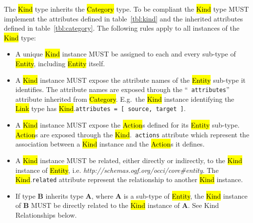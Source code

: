 \documentclass[10pt,a4paper]{article}
\begin{document}
The \hl{Kind} type inherits the \hl{Category} type. To be compliant the \hl{Kind}
type MUST implement the attributes defined in table~\ref{tbl:kind} and the inherited
attributes defined in table~\ref{tbl:category}. The following rules apply to all
instances of the \hl{Kind} type:
\begin{itemize}
\item A unique \hl{Kind} instance MUST be assigned to each and every sub-type
 of \hl{Entity}, including \hl{Entity} itself.
\item A \hl{Kind} instance MUST expose the attribute names of the \hl{Entity}
 sub-type it identifies. The attribute names are exposed through the ``{\tt
 attributes}'' attribute inherited from \hl{Category}. E.g.~the \hl{Kind}
 instance identifying the \hl{Link} type has \hl{Kind}.{\tt attributes =
 [ source, target ]}.
\item A \hl{Kind} instance MUST expose the \hl{Action}s defined for its
 \hl{Entity} sub-type. \hl{Action}s are exposed through the \hl{Kind}.{\tt
 actions} attribute which represent the association between a \hl{Kind}
 instance and the \hl{Action}s it defines.
\item A \hl{Kind} instance MUST be related, either directly or indirectly, to
 the \hl{Kind} instance of \hl{Entity},
 i.e. \textit{http://schemas.ogf.org/occi/core\#entity}.
 The \hl{Kind}.{\tt related} attribute represent the relationship to another
 \hl{Kind} instance.
\item If type {\bf B} inherits type {\bf A}, where {\bf A} is a sub-type of
 \hl{Entity}, the \hl{Kind} instance of {\bf B} MUST be directly related to the
 \hl{Kind} instance of {\bf A}. See Kind Relationships below.
\end{itemize}
\end{document}
